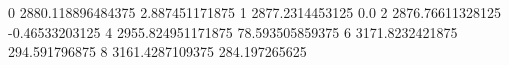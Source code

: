 0 2880.118896484375 2.887451171875
1 2877.2314453125 0.0
2 2876.76611328125 -0.46533203125
4 2955.824951171875 78.593505859375
6 3171.8232421875 294.591796875
8 3161.4287109375 284.197265625
